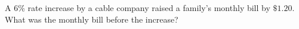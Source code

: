 A $6\%$ rate increase by a cable company raised a family's monthly bill by $\$1.20$. What was the monthly bill before the increase?
